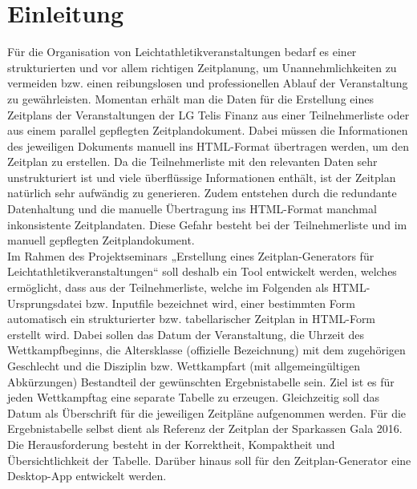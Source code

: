
\chapter{Einleitung}
\label{chap:Einleitung}

Für die Organisation von Leichtathletikveranstaltungen bedarf es einer strukturierten und vor allem richtigen Zeitplanung, um Unannehmlichkeiten zu vermeiden bzw. einen reibungslosen und professionellen Ablauf der Veranstaltung zu gewährleisten. Momentan erhält man die Daten für die Erstellung eines Zeitplans der Veranstaltungen der LG Telis Finanz aus einer Teilnehmerliste oder aus einem parallel gepflegten Zeitplandokument. Dabei müssen die Informationen des jeweiligen Dokuments manuell ins \ac{HTML}-Format übertragen werden, um den Zeitplan zu erstellen. Da die Teilnehmerliste mit den relevanten Daten sehr unstrukturiert ist und viele überflüssige Informationen enthält, ist der Zeitplan natürlich sehr aufwändig zu generieren. Zudem entstehen durch die redundante Datenhaltung und die manuelle Übertragung ins HTML-Format manchmal inkonsistente Zeitplandaten. Diese Gefahr besteht bei der Teilnehmerliste und im manuell gepflegten Zeitplandokument. \\
Im Rahmen des Projektseminars „Erstellung eines Zeitplan-Generators für Leichtathletikveranstaltungen“ soll deshalb ein Tool entwickelt werden, welches ermöglicht, dass aus der Teilnehmerliste, welche im Folgenden als \ac{HTML}-Ursprungsdatei bzw. Inputfile bezeichnet wird, einer bestimmten Form automatisch ein strukturierter bzw. tabellarischer Zeitplan in HTML-Form erstellt wird. Dabei sollen das Datum der Veranstaltung, die Uhrzeit des Wettkampfbeginns, die Altersklasse (offizielle Bezeichnung) mit dem zugehörigen Geschlecht und die Disziplin bzw. Wettkampfart (mit allgemeingültigen Abkürzungen) Bestandteil der gewünschten Ergebnistabelle sein. Ziel ist es für jeden Wettkampftag eine separate Tabelle zu erzeugen. Gleichzeitig soll das Datum als Überschrift für die jeweiligen Zeitpläne aufgenommen werden. Für die Ergebnistabelle selbst dient als Referenz der Zeitplan der Sparkassen Gala 2016.
Die Herausforderung besteht in der Korrektheit, Kompaktheit und Übersichtlichkeit der Tabelle. 
Darüber hinaus soll für den Zeitplan-Generator eine Desktop-App entwickelt werden.\\
